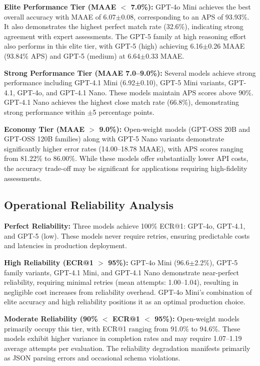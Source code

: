 \documentclass[letterpaper]{article} %
\begin{document}
\textbf{Elite Performance Tier (MAAE $<$ 7.0\%):} GPT-4o Mini achieves the best overall accuracy with MAAE of 6.07$\pm$0.08, corresponding to an APS of 93.93\%. It also demonstrates the highest perfect match rate (32.6\%), indicating strong agreement with expert assessments. The GPT-5 family at high reasoning effort also performs in this elite tier, with GPT-5 (high) achieving 6.16$\pm$0.26 MAAE (93.84\% APS) and GPT-5 (medium) at 6.64$\pm$0.33 MAAE.

\textbf{Strong Performance Tier (MAAE 7.0--9.0\%):} Several models achieve strong performance including GPT-4.1 Mini (6.92$\pm$0.10), GPT-5 Mini variants, GPT-4.1, GPT-4o, and GPT-4.1 Nano. These models maintain APS scores above 90\%. GPT-4.1 Nano achieves the highest close match rate (66.8\%), demonstrating strong performance within $\pm$5 percentage points.

\textbf{Economy Tier (MAAE $>$ 9.0\%):} Open-weight models (GPT-OSS 20B and GPT-OSS 120B families) along with GPT-5 Nano variants demonstrate significantly higher error rates (14.00--18.78 MAAE), with APS scores ranging from 81.22\% to 86.00\%. While these models offer substantially lower API costs, the accuracy trade-off may be significant for applications requiring high-fidelity assessments.

\subsection{Operational Reliability Analysis}

\textbf{Perfect Reliability:} Three models achieve 100\% ECR@1: GPT-4o, GPT-4.1, and GPT-5 (low). These models never require retries, ensuring predictable costs and latencies in production deployment.

\textbf{High Reliability (ECR@1 $>$ 95\%):} GPT-4o Mini (96.6$\pm$2.2\%), GPT-5 family variants, GPT-4.1 Mini, and GPT-4.1 Nano demonstrate near-perfect reliability, requiring minimal retries (mean attempts: 1.00--1.04), resulting in negligible cost increases from reliability overhead. GPT-4o Mini's combination of elite accuracy and high reliability positions it as an optimal production choice.

\textbf{Moderate Reliability (90\% $<$ ECR@1 $<$ 95\%):} Open-weight models primarily occupy this tier, with ECR@1 ranging from 91.0\% to 94.6\%. These models exhibit higher variance in completion rates and may require 1.07--1.19 average attempts per evaluation. The reliability degradation manifests primarily as JSON parsing errors and occasional schema violations.
\end{document}
